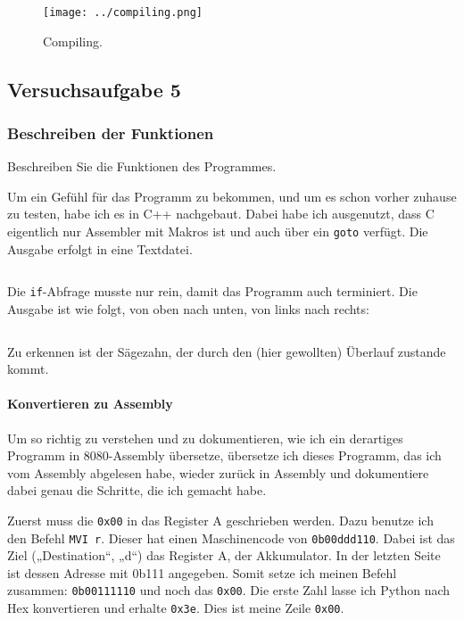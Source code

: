 \begin{figure}[htbp]
	\centering
	\texttt{[image: ../compiling.png]}
	\caption{%
		Compiling. \cite{xkcd/303}
	}
	\label{fig:compiling}
\end{figure}

\FloatBarrier
\subsection{Versuchsaufgabe 5}

\subsubsection{Beschreiben der Funktionen}

\begin{problem}
	Beschreiben Sie die Funktionen des Programmes.
\end{problem}

Um ein Gefühl für das Programm zu bekommen, und um es schon vorher zuhause zu
testen, habe ich es in C++ nachgebaut. Dabei habe ich ausgenutzt, dass C
eigentlich nur Assembler mit Makros ist und auch über ein \texttt{goto}
verfügt. Die Ausgabe erfolgt in eine Textdatei.

\inputminted[fontsize=\small, linenos]{cpp}{../Prototypen/saegezahn.cpp}

Die \texttt{if}-Abfrage musste nur rein, damit das Programm auch terminiert.
Die Ausgabe ist wie folgt, von oben nach unten, von links nach rechts:

\begin{multicols}{9}
	\inputminted[fontsize=\footnotesize]{text}{saegezahn.txt}
\end{multicols}

Zu erkennen ist der Sägezahn, der durch den (hier gewollten) Überlauf zustande
kommt.

\paragraph{Konvertieren zu Assembly}

Um so richtig zu verstehen und zu dokumentieren, wie ich ein derartiges
Programm in 8080-Assembly übersetze, übersetze ich dieses Programm, das ich vom
Assembly abgelesen habe, wieder zurück in Assembly und dokumentiere dabei genau
die Schritte, die ich gemacht habe.

Zuerst muss die \texttt{0x00} in das Register A geschrieben werden. Dazu
benutze ich den Befehl \texttt{MVI~r}. Dieser hat einen Maschinencode von
\texttt{0b00ddd110}. Dabei ist das Ziel („Destination“, „d“) das Register A, der
Akkumulator. In der letzten Seite ist dessen Adresse mit 0b111 angegeben. Somit
setze ich meinen Befehl zusammen: \texttt{0b00111110} und noch das \texttt{0x00}.
Die erste Zahl lasse ich Python nach Hex konvertieren und erhalte
\texttt{0x3e}. Dies ist meine Zeile \texttt{0x00}.

